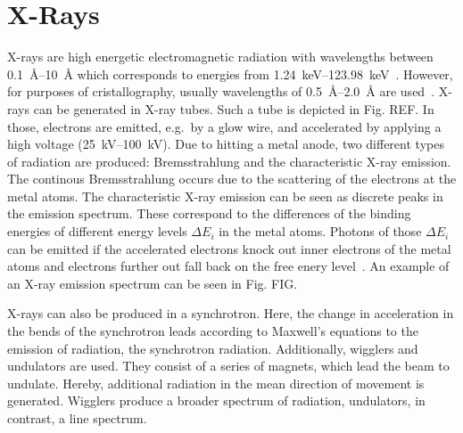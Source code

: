  
\section{X-Rays}\label{sec:Q1}

X-rays are high energetic electromagnetic radiation with wavelengths between \SIrange{0.1}{10}{\angstrom} which corresponds to energies from \SIrange{1.24}{123.98}{\kilo\eV}~\cite{Bohm.2021}. However, for purposes of cristallography, usually wavelengths of \SIrange{0.5}{2.0}{\angstrom} are used~\cite{Schwarzenbach.2001}. X-rays can be generated in X-ray tubes. Such a tube is depicted in Fig. REF. In those, electrons are emitted, e.g.~by a glow wire, and accelerated by applying a high voltage (\SIrange{25}{100}{\kilo\V}). Due to hitting a metal anode, two different types of radiation are produced: Bremsstrahlung and the characteristic X-ray emission. The continous Bremsstrahlung occurs due to the scattering of the electrons at the metal atoms. The characteristic X-ray emission can be seen as discrete peaks in the emission spectrum. These correspond to the differences of the binding energies of different energy levels $\Delta E_i$ in the metal atoms. Photons of those $\Delta E_i$ can be emitted if the accelerated electrons knock out inner electrons of the metal atoms and electrons further out fall back on the free enery level~\cite{Bohm.2021}. An example of an X-ray emission spectrum can be seen in Fig. FIG. \par 
X-rays can also be produced in a synchrotron. Here, the change in acceleration in the bends of the synchrotron leads according to Maxwell's equations to the emission of radiation, the synchrotron radiation. Additionally, wigglers and undulators are used. They consist of a series of magnets, which lead the beam to undulate. Hereby, additional radiation in the mean direction of movement is generated. Wigglers produce a broader spectrum of radiation, undulators, in contrast, a line spectrum.



